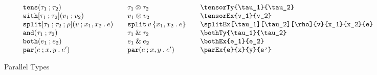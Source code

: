 \documentclass[11pt]{article}
\begin{document}
\begin{figure}

  \begin{small}
    \begin{displaymath}
      \begin{array}{l@{\qquad}l@{\qquad}l@{\qquad}l}
        \tensorTy{\tau_1}{\tau_2}                      & \tensorTy*{\tau_1}{\tau_2} & \verb|\tensorTy{\tau_1}{\tau_2}|                      \\
        \tensorEx{v_1}{v_2}                            & \tensorEx*{v_1}{v_2}       & \verb|\tensorEx{v_1}{v_2}|                            \\
        \splitEx[\tau_1][\tau_2][\rho]{v}{x_1}{x_2}{e} & \splitEx*{v}{x_1}{x_2}{e}  & \verb|\splitEx[\tau_1][\tau_2][\rho]{v}{x_1}{x_2}{e}| \\
        \bothTy{\tau_1}{\tau_2}                        & \bothTy*{\tau_1}{\tau_2}   & \verb|\bothTy{\tau_1}{\tau_2}|                        \\
        \bothEx{e_1}{e_2}                              & \bothEx*{e_1}{e_2}         & \verb|\bothEx{e_1}{e_2}|                              \\
        \parEx{e}{x}{y}{e'}                            & \parEx*{e}{x}{y}{e'}       & \verb|\parEx{e}{x}{y}{e'}|
      \end{array}
    \end{displaymath}
  \end{small}

  \caption{Parallel Types}
  \label{fig:par}
\end{figure}
\end{document}
